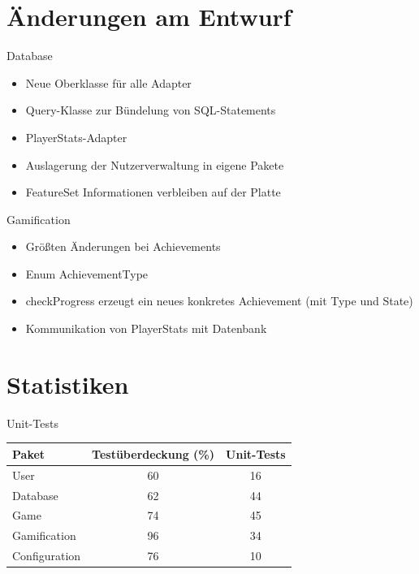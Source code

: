 \documentclass[xcolor=dvipsnames]{beamer}
\begin{document}
\section{Änderungen am Entwurf}
\begin{frame}{Database}
    \begin{itemize}
        \item Neue Oberklasse für alle Adapter
        \item Query-Klasse zur Bündelung von SQL-Statements
        \item PlayerStats-Adapter
        \item Auslagerung der Nutzerverwaltung in eigene Pakete
        \item FeatureSet Informationen verbleiben auf der Platte
    \end{itemize}
\end{frame}

\begin{frame}{Gamification}
  \begin{itemize}
     \item Größten Änderungen bei Achievements
     \item Enum AchievementType
     \item checkProgress erzeugt ein neues konkretes Achievement (mit Type und State)
     \item Kommunikation von PlayerStats mit Datenbank
  \end{itemize}
\end{frame}

\renewcommand{\arraystretch}{1.5}

\section{Statistiken}
\begin{frame}{Unit-Tests}
  \begin{center}
    \begin{tabular}{ | l | c | c | }
      \hline
      Paket & Testüberdeckung (\%) & Unit-Tests \\ \hline
      User & 60 & 16 \\
      Database & 62 & 44 \\
      Game & 74 & 45 \\
      Gamification & 96 & 34 \\
      Configuration & 76 & 10 \\
      \hline
    \end{tabular}
  \end{center}
\end{frame}
\end{document}

